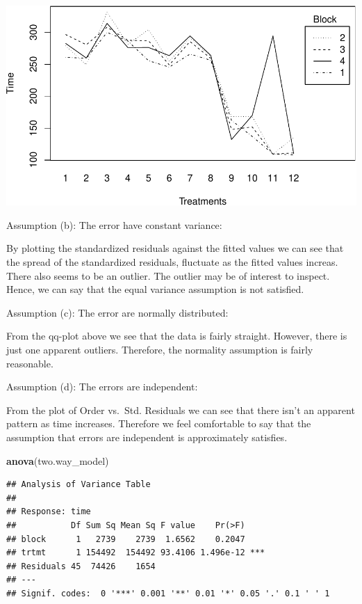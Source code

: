 \documentclass[12pt,]{article}
\newenvironment{Shaded}{\begin{snugshade}}{\end{snugshade}}
\newcommand{\KeywordTok}[1]{\textcolor[rgb]{0.13,0.29,0.53}{\textbf{#1}}}
\newcommand{\NormalTok}[1]{#1}
\begin{document}
\includegraphics{Markdown_HW_8_files/figure-latex/unnamed-chunk-4-2.pdf}

Assumption (b): The error have constant variance:

By plotting the standardized residuals against the fitted values we can
see that the spread of the standardized residuals, fluctuate as the
fitted values increas. There also seems to be an outlier. The outlier
may be of interest to inspect. Hence, we can say that the equal variance
assumption is not satisfied.

Assumption (c): The error are normally distributed:

From the qq-plot above we see that the data is fairly straight. However,
there is just one apparent outliers. Therefore, the normality assumption
is fairly reasonable.

Assumption (d): The errors are independent:

From the plot of Order vs.~Std. Residuals we can see that there isn't an
apparent pattern as time increases. Therefore we feel comfortable to say
that the assumption that errors are independent is approximately
satisfies.

\begin{Shaded}
\begin{Highlighting}[]
\KeywordTok{anova}\NormalTok{(two.way_model)}
\end{Highlighting}
\end{Shaded}

\begin{verbatim}
## Analysis of Variance Table
## 
## Response: time
##           Df Sum Sq Mean Sq F value    Pr(>F)    
## block      1   2739    2739  1.6562    0.2047    
## trtmt      1 154492  154492 93.4106 1.496e-12 ***
## Residuals 45  74426    1654                      
## ---
## Signif. codes:  0 '***' 0.001 '**' 0.01 '*' 0.05 '.' 0.1 ' ' 1
\end{verbatim}
\end{document}
